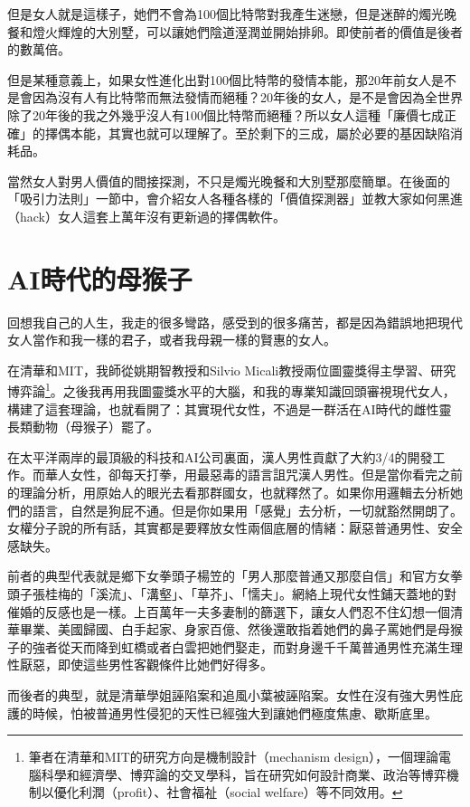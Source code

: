 但是女人就是這樣子，她們不會為100個比特幣對我產生迷戀，但是迷醉的燭光晚餐和燈火輝煌的大別墅，可以讓她們陰道溼潤並開始排卵。即使前者的價值是後者的數萬倍。

但是某種意義上，如果女性進化出對100個比特幣的發情本能，那20年前女人是不是會因為沒有人有比特幣而無法發情而絕種？20年後的女人，是不是會因為全世界除了20年後的我之外幾乎沒人有100個比特幣而絕種？所以女人這種「廉價七成正確」的擇偶本能，其實也就可以理解了。至於剩下的三成，屬於必要的基因缺陷消耗品。

當然女人對男人價值的間接探測，不只是燭光晚餐和大別墅那麼簡單。在後面的「吸引力法則」一節中，會介紹女人各種各樣的「價值探測器」並教大家如何黑進（hack）女人這套上萬年沒有更新過的擇偶軟件。

\section{AI時代的母猴子}

回想我自己的人生，我走的很多彎路，感受到的很多痛苦，都是因為錯誤地把現代女人當作和我一樣的君子，或者我母親一樣的賢惠的女人。

在清華和MIT，我師從姚期智教授和Silvio Micali教授兩位圖靈獎得主學習、研究博弈論\footnote{筆者在清華和MIT的研究方向是機制設計（mechanism design），一個理論電腦科學和經濟學、博弈論的交叉學科，旨在研究如何設計商業、政治等博弈機制以優化利潤（profit）、社會福祉（social welfare）等不同效用。}。之後我再用我圖靈獎水平的大腦，和我的專業知識回頭審視現代女人，構建了這套理論，也就看開了：其實現代女性，不過是一群活在AI時代的雌性靈長類動物（母猴子）罷了。

在太平洋兩岸的最頂級的科技和AI公司裏面，漢人男性貢獻了大約3/4的開發工作。而華人女性，卻每天打拳，用最惡毒的語言詛咒漢人男性。但是當你看完之前的理論分析，用原始人的眼光去看那群國女，也就釋然了。如果你用邏輯去分析她們的語言，自然是狗屁不通。但是你如果用「感覺」去分析，一切就豁然開朗了。女權分子說的所有話，其實都是要釋放女性兩個底層的情緒：厭惡普通男性、安全感缺失。

前者的典型代表就是鄉下女拳頭子楊笠的「男人那麼普通又那麼自信」和官方女拳頭子張桂梅的「溪流」、「溝壑」、「草芥」、「懦夫」。網絡上現代女性鋪天蓋地的對催婚的反感也是一樣。上百萬年一夫多妻制的篩選下，讓女人們忍不住幻想一個清華畢業、美國歸國、白手起家、身家百億、然後還敢指着她們的鼻子罵她們是母猴子的強者從天而降到虹橋或者白雲把她們娶走，而對身邊千千萬普通男性充滿生理性厭惡，即使這些男性客觀條件比她們好得多。

而後者的典型，就是清華學姐誣陷案和追風小葉被誣陷案。女性在沒有強大男性庇護的時候，怕被普通男性侵犯的天性已經強大到讓她們極度焦慮、歇斯底里。

